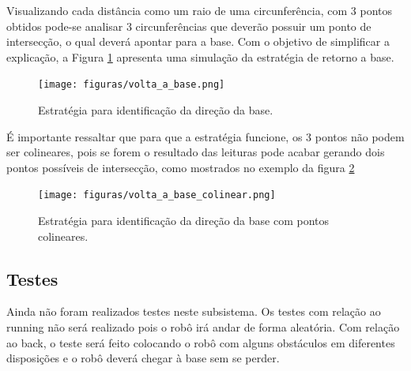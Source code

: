 	 	Visualizando cada distância como um raio de uma circunferência, com 3 pontos obtidos pode-se analisar 3 circunferências que deverão possuir um ponto de intersecção, o qual deverá apontar para a base. Com o objetivo de simplificar a explicação, a Figura \ref{img:back} apresenta uma simulação da estratégia de retorno a base.

	 	\begin{figure}[H]
			\centering
			\texttt{[image: figuras/volta\_a\_base.png]}
			\caption{Estratégia para identificação da direção da base.}
			\label{img:back}
		\end{figure} 

		É importante ressaltar que para que a estratégia funcione, os 3 pontos não podem ser colineares, pois se forem o resultado das leituras pode acabar gerando dois pontos possíveis de intersecção, como mostrados no exemplo da figura \ref{img:back2}

		\begin{figure}[H]
			\centering
			\texttt{[image: figuras/volta\_a\_base\_colinear.png]}
			\caption{Estratégia para identificação da direção da base com pontos colineares.}
			\label{img:back2}
		\end{figure} 

	 \subsection{Testes}
	
		Ainda não foram realizados testes neste subsistema. Os testes com relação ao running não será realizado pois o robô irá andar de forma aleatória. Com relação ao back, o teste será feito colocando o robô com alguns obstáculos em diferentes disposições e o robô deverá chegar à base sem se perder.
